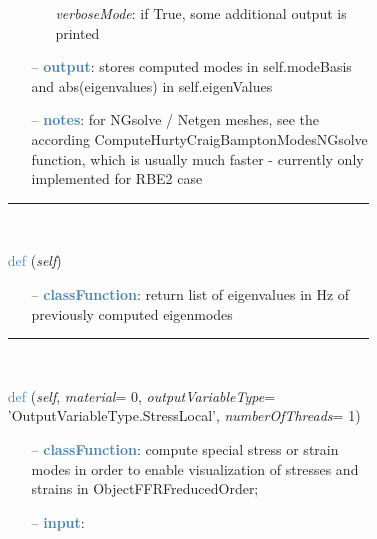 \begin{itemize}[leftmargin=1.4cm]
\begin{itemize}[leftmargin=1.4cm]
\begin{itemize}[leftmargin=0.5cm]
\begin{itemize}[leftmargin=1.4cm]
\begin{itemize}[leftmargin=1.4cm]
\begin{itemize}[leftmargin=0.5cm]
\begin{itemize}[leftmargin=0.7cm]
\begin{itemize}[leftmargin=1.2cm]
    \item[] {\it   verboseMode}: if True, some additional output is printed
  \end{itemize}
  \item[--]  \textcolor{steelblue}{\bf output}: stores computed modes in self.modeBasis and abs(eigenvalues) in self.eigenValues  \item[--]  \textcolor{steelblue}{\bf notes}: for NGsolve / Netgen meshes, see the according ComputeHurtyCraigBamptonModesNGsolve function, which is usually much faster - currently only implemented for RBE2 case\vspace{12pt}\end{itemize}
%
\noindent\rule{8cm}{0.75pt}\vspace{1pt} \\ 
\begin{flushleft}
\noindent \textcolor{steelblue}{def {\bf {}}}\label{sec:FEM:FEMinterface:GetEigenFrequenciesHz}
({\it self})
\end{flushleft}
\setlength{\itemindent}{0.7cm}
\begin{itemize}[leftmargin=0.7cm]
  \item[--]  \textcolor{steelblue}{\bf classFunction}: return list of eigenvalues in Hz of previously computed eigenmodes\vspace{12pt}\end{itemize}
%
\noindent\rule{8cm}{0.75pt}\vspace{1pt} \\ 
\begin{flushleft}
\noindent \textcolor{steelblue}{def {\bf {}}}\label{sec:FEM:FEMinterface:ComputePostProcessingModes}
({\it self}, {\it material}= 0, {\it outputVariableType}= 'OutputVariableType.StressLocal', {\it numberOfThreads}= 1)
\end{flushleft}
\setlength{\itemindent}{0.7cm}
\begin{itemize}[leftmargin=0.7cm]
  \item[--]  \textcolor{steelblue}{\bf classFunction}: compute special stress or strain modes in order to enable visualization of stresses and strains in ObjectFFRFreducedOrder;  \item[--]  \textcolor{steelblue}{\bf input}: \vspace{-6pt}
  \begin{itemize}[leftmargin=1.2cm]

\end{itemize}
\end{itemize}
\end{itemize}
\end{itemize}
\end{itemize}
\end{itemize}
\end{itemize}
\end{itemize}
